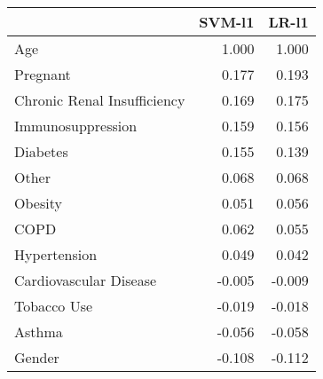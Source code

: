 \begin{tabular}{lrr}
\toprule
{} &  SVM-l1 &  LR-l1 \\
\midrule
Age                         &   1.000 &  1.000 \\
Pregnant                    &   0.177 &  0.193 \\
Chronic Renal Insufficiency &   0.169 &  0.175 \\
Immunosuppression           &   0.159 &  0.156 \\
Diabetes                    &   0.155 &  0.139 \\
Other                       &   0.068 &  0.068 \\
Obesity                     &   0.051 &  0.056 \\
COPD                        &   0.062 &  0.055 \\
Hypertension                &   0.049 &  0.042 \\
Cardiovascular Disease      &  -0.005 & -0.009 \\
Tobacco Use                 &  -0.019 & -0.018 \\
Asthma                      &  -0.056 & -0.058 \\
Gender                      &  -0.108 & -0.112 \\
\bottomrule
\end{tabular}
